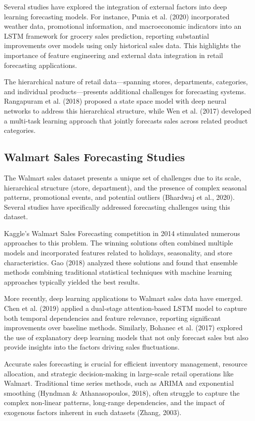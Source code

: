\documentclass[conference]{IEEEtran}
\begin{document}
Several studies have explored the integration of external factors into deep learning forecasting models. For instance, Punia et al. (2020) incorporated weather data, promotional information, and macroeconomic indicators into an LSTM framework for grocery sales prediction, reporting substantial improvements over models using only historical sales data. This highlights the importance of feature engineering and external data integration in retail forecasting applications.

The hierarchical nature of retail data—spanning stores, departments, categories, and individual products—presents additional challenges for forecasting systems. Rangapuram et al. (2018) proposed a state space model with deep neural networks to address this hierarchical structure, while Wen et al. (2017) developed a multi-task learning approach that jointly forecasts sales across related product categories.

\subsection{Walmart Sales Forecasting Studies}
The Walmart sales dataset presents a unique set of challenges due to its scale, hierarchical structure (store, department), and the presence of complex seasonal patterns, promotional events, and potential outliers (Bhardwaj et al., 2020). Several studies have specifically addressed forecasting challenges using this dataset.

Kaggle's Walmart Sales Forecasting competition in 2014 stimulated numerous approaches to this problem. The winning solutions often combined multiple models and incorporated features related to holidays, seasonality, and store characteristics. Gao (2018) analyzed these solutions and found that ensemble methods combining traditional statistical techniques with machine learning approaches typically yielded the best results.

More recently, deep learning applications to Walmart sales data have emerged. Chen et al. (2019) applied a dual-stage attention-based LSTM model to capture both temporal dependencies and feature relevance, reporting significant improvements over baseline methods. Similarly, Bohanec et al. (2017) explored the use of explanatory deep learning models that not only forecast sales but also provide insights into the factors driving sales fluctuations.

Accurate sales forecasting is crucial for efficient inventory management, resource allocation, and strategic decision-making in large-scale retail operations like Walmart. Traditional time series methods, such as ARIMA and exponential smoothing (Hyndman \& Athanasopoulos, 2018), often struggle to capture the complex non-linear patterns, long-range dependencies, and the impact of exogenous factors inherent in such datasets (Zhang, 2003).
\end{document}
